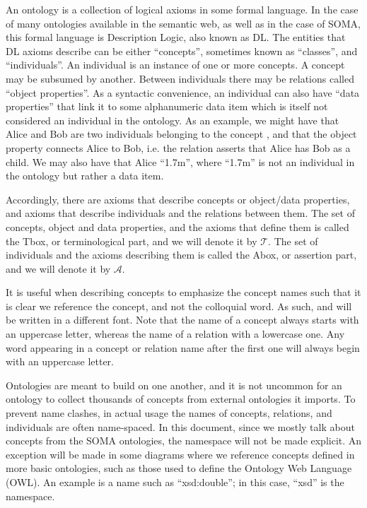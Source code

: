 An ontology is a collection of logical axioms in some formal language. In the case of many ontologies available in the semantic web, as well as in the case of SOMA, this formal language is Description Logic, also known as DL. The entities that DL axioms describe can be either ``concepts'', sometimes known as ``classes'', and ``individuals''. An individual is an instance of one or more concepts. A concept may be subsumed by another. Between individuals there may be relations called ``object properties''. As a syntactic convenience, an individual can also have ``data properties'' that link it to some alphanumeric data item which is itself not considered an individual in the ontology. As an example, we might have that Alice and Bob are two individuals belonging to the concept , and that the object property  connects Alice to Bob, i.e. the relation asserts that Alice has Bob as a child. We may also have that Alice  ``1.7m'', where ``1.7m'' is not an individual in the ontology but rather a data item.

Accordingly, there are axioms that describe concepts or object/data properties, and axioms that describe individuals and the relations between them. The set of concepts, object and data properties, and the axioms that define them is called the Tbox, or terminological part, and we will denote it by $\mathcal{T}$. The set of individuals and the axioms describing them is called the Abox, or assertion part, and we will denote it by $\mathcal{A}$.

It is useful when describing concepts to emphasize the concept names such that it is clear we reference the concept, and not the colloquial word. As such,  and  will be written in a different font. Note that the name of a concept always starts with an uppercase letter, whereas the name of a relation with a lowercase one. Any word appearing in a concept or relation name after the first one will always begin with an uppercase letter.

Ontologies are meant to build on one another, and it is not uncommon for an ontology to collect thousands of concepts from external ontologies it imports. To prevent name clashes, in actual usage the names of concepts, relations, and individuals are often name-spaced. In this document, since we mostly talk about concepts from the SOMA ontologies, the namespace will not be made explicit. An exception will be made in some diagrams where we reference concepts defined in more basic ontologies, such as those used to define the Ontology Web Language (OWL). An example is a name such as ``xsd:double''; in this case, ``xsd'' is the namespace.

